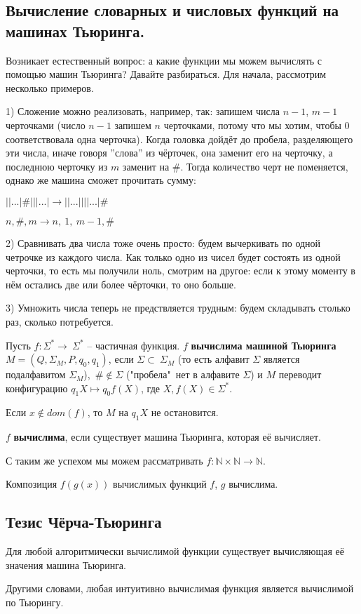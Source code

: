 \subsection*{Вычисление словарных и числовых функций на машинах Тьюринга.}
\par Возникает естественный вопрос: а какие функции мы можем вычислять с помощью машин Тьюринга? Давайте
разбираться. Для начала, рассмотрим несколько примеров.
\par 
\begin{example}
	\par 1) Сложение можно реализовать, например, так: запишем числа $n-1$, $m-1$ черточками (число $n-1$ запишем $n$
	черточками, потому что мы хотим, чтобы 0 соответствовала одна черточка). Когда головка дойдёт до пробела,
	разделяющего эти числа, иначе говоря ''слова'' из чёрточек, она заменит его на черточку, а последнюю черточку
	из $m$ заменит на $\#$. Тогда количество черт не поменяется, однако же машина сможет прочитать сумму:
	\par $||...| \#|||...| \to ||...||||...|\#$
	\par $n, \#, m \to n,\ 1,\ m-1, \#$
	\par 2) Сравнивать два числа тоже очень просто: будем вычеркивать по одной четрочке из каждого числа. Как только
	одно из чисел будет состоять из одной черточки, то есть мы получили ноль, смотрим на другое: если к этому
	моменту в нём остались две или более чёрточки, то оно больше.
	\par 3) Умножить числа теперь не предствляется трудным: будем складывать столько раз, сколько потребуется. 
\end{example}
\par 
\begin{definition}
	Пусть $f : \Sigma^* \to\ \Sigma^*$ -- частичная функция. $f$ \textbf{вычислима машиной Тьюринга} $M=(Q,
	\Sigma_{M}, P, q_{0}, q_{1})$, если $\Sigma \subset\ \Sigma_{M}$ (то есть алфавит $\Sigma$ является
	подалфавитом $\Sigma_{M}$),\ $\# \notin \Sigma$ ("пробела"\ нет в алфавите $\Sigma$) и $M$ переводит
	конфигурацию $q_{1}X \mapsto q_{0}f(X)$, где $X, f(X) \in \Sigma^*$.
\end{definition}
\par Если $x \notin dom(f)$, то $M$ на $q_{1}X$ не остановится.
\begin{definition} $f$ \textbf{вычислима}, если существует машина Тьюринга, которая её вычисляет.
\end{definition}

\begin{remark}
	\par С таким же успехом мы можем рассматривать $f: \mathbb{N} \times \mathbb{N} \to \mathbb{N}$. 
\end{remark}
\begin{remark}
	\par Композиция $f(g(x))$ вычислимых функций $f$, $g$ вычислима.
\end{remark}
\subsection*{Тезис Чёрча-Тьюринга}
\begin{theorem} Для любой алгоритмически вычислимой функции существует вычисляющая
	её значения машина Тьюринга.
\end{theorem}
Другими словами, любая интуитивно вычислимая функция является вычислимой по Тьюрингу.
